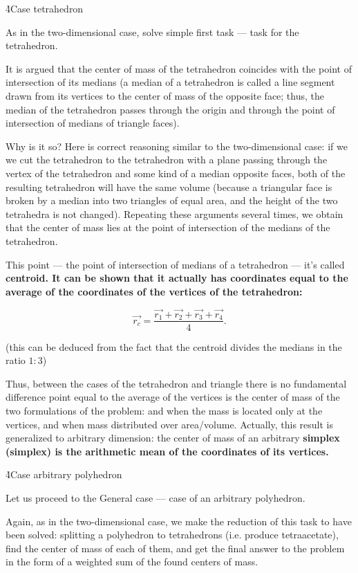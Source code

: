 \h4{Case tetrahedron}

As in the two-dimensional case, solve simple first task --- task for the tetrahedron.

It is argued that the center of mass of the tetrahedron coincides with the point of intersection of its medians (a median of a tetrahedron is called a line segment drawn from its vertices to the center of mass of the opposite face; thus, the median of the tetrahedron passes through the origin and through the point of intersection of medians of triangle faces).

Why is it so? Here is correct reasoning similar to the two-dimensional case: if we we cut the tetrahedron to the tetrahedron with a plane passing through the vertex of the tetrahedron and some kind of a median opposite faces, both of the resulting tetrahedron will have the same volume (because a triangular face is broken by a median into two triangles of equal area, and the height of the two tetrahedra is not changed). Repeating these arguments several times, we obtain that the center of mass lies at the point of intersection of the medians of the tetrahedron.

This point --- the point of intersection of medians of a tetrahedron --- it's called \bf{centroid}. It can be shown that it actually has coordinates equal to the average of the coordinates of the vertices of the tetrahedron:

$$ \vec{r_c} = \frac{ \vec{r_1} + \vec{r_2} + \vec{r_3} + \vec{r_4} }{ 4 }. $$

(this can be deduced from the fact that the centroid divides the medians in the ratio $1:3$)

Thus, between the cases of the tetrahedron and triangle there is no fundamental difference point equal to the average of the vertices is the center of mass of the two formulations of the problem: and when the mass is located only at the vertices, and when mass distributed over area/volume. Actually, this result is generalized to arbitrary dimension: the center of mass of an arbitrary \bf{simplex} (simplex) is the arithmetic mean of the coordinates of its vertices.

\h4{Case arbitrary polyhedron}

Let us proceed to the General case --- case of an arbitrary polyhedron.

Again, as in the two-dimensional case, we make the reduction of this task to have been solved: splitting a polyhedron to tetrahedrons (i.e. produce tetraacetate), find the center of mass of each of them, and get the final answer to the problem in the form of a weighted sum of the found centers of mass.

